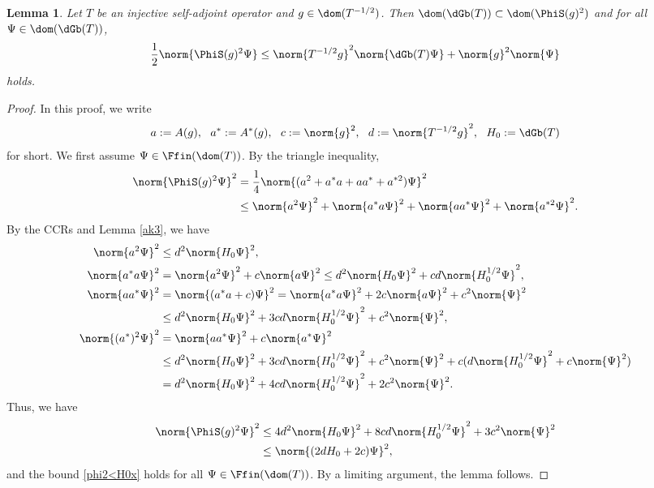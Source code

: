 \documentclass[12pt,draft]{article}
\theoremstyle{plain}
\newtheorem{lem}[theorem]{\bf Lemma}
\numberwithin{equation}{section}
\theoremstyle{remark}
\begin{document}
\begin{lem}{\label{phi2<H0}}
Let $T$ be an injective self-adjoint operator and $g\in\dom(T^{-1/2})$.
Then $\dom(\dGb(T))\subset \dom(\PhiS(g)^2)$ and for all $\Psi\in\dom(\dGb(T))$,
\begin{align}
  \frac{1}{2} \norm{\PhiS(g)^2\Psi} 
 \leq \norm{T^{-1/2}g}^2 \norm{\dGb(T)\Psi} + \norm{g}^2\norm{\Psi} \label{phi2<H0x}
\end{align}
holds.
\end{lem}
\begin{proof}
In this proof, we write
\begin{align*}
 a:=A(g), ~~ a^*:=A^*(g), ~~ 
 c:=\norm{g}^2, ~~ d:=\norm{T^{-1/2}g}^2, ~~
 H_0 := \dGb(T)
\end{align*}
for short. 
We first assume $\Psi\in\Ffin(\dom(T))$.
By the triangle inequality,
\begin{align*}
 \norm{\PhiS(g)^2\Psi}^2 
 & = \frac{1}{4} \norm{(a^2 + a^*a + aa^* + a^{*2})\Psi}^2 \\
 & \leq \norm{a^2\Psi}^2 + \norm{a^*a\Psi}^2 + \norm{aa^*\Psi}^2 + \norm{a^{*2}\Psi}^2.
\end{align*}
By the CCRs and Lemma \ref{ak3}, we have
\begin{align*}
 \norm{a^2\Psi}^2 
&\leq d^2 \norm{H_0\Psi}^2, \\
 \norm{a^*a\Psi}^2 
& = \norm{a^2\Psi}^2 + c\norm{a\Psi}^2
  \leq d^2\norm{H_0\Psi}^2 + cd\norm{H_0^{1/2}\Psi}^2, \\
\norm{aa^*\Psi}^2 
& = \norm{(a^*a+c)\Psi}^2 
  = \norm{a^*a\Psi}^2 + 2c\norm{a\Psi}^2 + c^2\norm{\Psi}^2 \\
& \leq d^2\norm{H_0\Psi}^2+3cd\norm{H_0^{1/2}\Psi}^2 + c^2\norm{\Psi}^2, \\
\norm{(a^*)^2\Psi}^2 
 & = \norm{aa^*\Psi}^2 + c\norm{a^*\Psi}^2 \\
 & \leq  d^2\norm{H_0\Psi}^2+3cd\norm{H_0^{1/2}\Psi}^2 + c^2\norm{\Psi}^2 
   + c(d\norm{H_0^{1/2}\Psi}^2+c\norm{\Psi}^2) \\
 & =  d^2\norm{H_0\Psi}^2+4cd\norm{H_0^{1/2}\Psi}^2 + 2c^2\norm{\Psi}^2.
\end{align*}
Thus, we have
\begin{align*}
  \norm{\PhiS(g)^2\Psi}^2
& \leq 4d^2\norm{H_0\Psi}^2 + 8cd\norm{H_0^{1/2}\Psi}^2 + 3c^2\norm{\Psi}^2 \\
& \leq \norm{(2dH_0+2c)\Psi}^2,
\end{align*}
and the bound \eqref{phi2<H0x} holds for all $\Psi\in\Ffin(\dom(T))$.
By a limiting argument, the lemma follows.
\end{proof}
\end{document}
